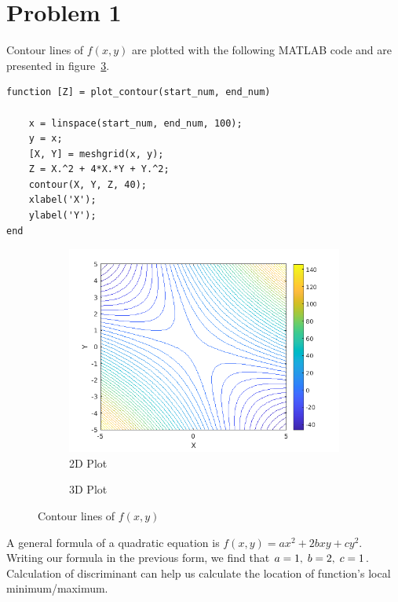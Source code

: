 \section{Problem 1}

Contour lines of $f(x,y)$ are plotted with the following MATLAB code and are presented in figure~\ref{fig:prob_1_contour_lines}.

\begin{lstlisting}[]
function [Z] = plot_contour(start_num, end_num)
	
	x = linspace(start_num, end_num, 100);
	y = x;
	[X, Y] = meshgrid(x, y);
	Z = X.^2 + 4*X.*Y + Y.^2;
	contour(X, Y, Z, 40);
	xlabel('X');
	ylabel('Y');
end
\end{lstlisting}
\begin{figure}[h]
	\centering
	\begin{subfigure}{0.4\textwidth}
		\includegraphics[width=\textwidth]{../Problem 1/contour_lines_2d.png}
		\caption{2D Plot}
		\label{fig:prob_1_contour_lines_2d}
	\end{subfigure}
	\begin{subfigure}{0.4\textwidth}
		
		\caption{3D Plot}
		\label{fig:prob_1_contour_lines_3d}
	\end{subfigure}
	\caption{Contour lines of $f(x,y)$ }
	\label{fig:prob_1_contour_lines}
\end{figure}

A general formula of a quadratic equation is $f(x,y) = ax^2 + 2bxy + cy^2$. Writing our formula in the previous form, we find that $a=1, \hspace{1mm} b=2, \hspace{1mm} c=1$.
Calculation of discriminant can help us calculate the location of function's local minimum/maximum.

